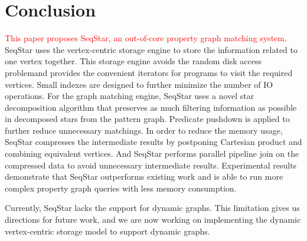\section{Conclusion}\label{sec:conclusion}
\textcolor{red}{This paper proposes SeqStar, an out-of-core property graph matching system.}
SeqStar uses the vertex-centric storage engine to store the information related to one vertex together.
This storage engine avoids the random disk access problemand provides the convenient iterators for programs to visit the required vertices.
Small indexes are designed to further minimize the number of IO operations.
For the graph matching engine,
SeqStar uses a novel star decomposition algorithm that preserves as much filtering information as possible in decomposed stars from the pattern graph.
Predicate pushdown is applied to further reduce unnecessary matchings.
In order to reduce the memory usage, SeqStar compresses the intermediate results by postponing Cartesian product and combining equivalent vertices.
And SeqStar performs parallel pipeline join on the compressed data to avoid unnecessary intermediate results.
Experimental results demonstrate that SeqStar outperforms existing work and is able to run more complex property graph queries with less memory consumption.


Currently, SeqStar lacks the support for dynamic graphs.
This limitation gives us directions for future work,
and we are now working on implementing the dynamic vertex-centric storage model to support dynamic graphs.
